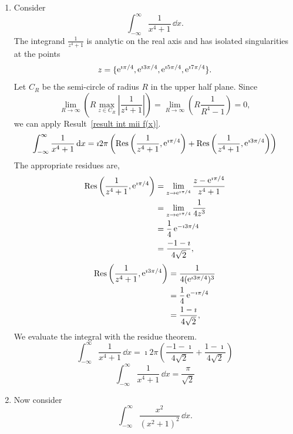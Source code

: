 {%
\begin{Solution}
  \label{solution 1/(x^4+1)}
  \begin{enumerate}
  \item
    Consider
    \[
    \int_{-\infty}^\infty \frac{1}{x^4 + 1} \,\dd x.
    \]
    The integrand $\frac{1}{z^4+1}$ is analytic on the real axis and has isolated
    singularities at the points 
    \[
    z = \{ \mathop{\mathrm{e}}\nolimits^{\imath \pi / 4}, \mathop{\mathrm{e}}\nolimits^{\imath 3 \pi / 4}, \mathop{\mathrm{e}}\nolimits^{\imath 5 \pi / 4}, \mathop{\mathrm{e}}\nolimits^{\imath 7 \pi / 4} \}.
    \]
    Let $C_R$ be the semi-circle of radius $R$ in the upper half plane.  Since 
    \[
    \lim_{R \to \infty} \left( R \max_{z \in C_R} \left| \frac{1}{z^4 + 1} \right|
    \right)
    = \lim_{R \to \infty} \left( R \frac{1}{R^4 - 1} \right) = 0,
    \]
    we can apply Result~\ref{result int mii f(x)}.
    \[
    \int_{-\infty}^\infty \frac{1}{x^4 + 1}\,\mathrm{d} x = \imath 2 \pi \left(
      \mathop{\mathrm{Res}}\nolimits\left( \frac{1}{z^4+1}, \mathop{\mathrm{e}}\nolimits^{\imath \pi / 4} \right) +
      \mathop{\mathrm{Res}}\nolimits\left( \frac{1}{z^4+1}, \mathop{\mathrm{e}}\nolimits^{\imath 3 \pi / 4} \right) \right)
    \]
    The appropriate residues are,
    \begin{align*}
      \mathop{\mathrm{Res}}\nolimits\left( \frac{1}{z^4+1}, \mathop{\mathrm{e}}\nolimits^{\imath \pi / 4} \right)
      &= \lim_{z \to \mathop{\mathrm{e}}\nolimits^{\imath \pi / 4}} \frac{z - \mathop{\mathrm{e}}\nolimits^{\imath \pi / 4}}{z^4+1} \\
      &= \lim_{z \to \mathop{\mathrm{e}}\nolimits^{\imath \pi / 4}} \frac{1}{4 z^3} \\
      &= \frac{1}{4} \mathop{\mathrm{e}}\nolimits^{- \imath 3 \pi / 4} \\
      &= \frac{-1 - \imath}{4 \sqrt{2}},
    \end{align*}
    \begin{align*}
      \mathop{\mathrm{Res}}\nolimits\left( \frac{1}{z^4+1}, \mathop{\mathrm{e}}\nolimits^{\imath 3 \pi / 4} \right)
      &= \frac{1}{4 (\mathop{\mathrm{e}}\nolimits^{\imath 3 \pi / 4})^3} \\
      &= \frac{1}{4} \mathop{\mathrm{e}}\nolimits^{- \imath \pi / 4} \\
      &= \frac{1 - \imath}{4 \sqrt{2}},
    \end{align*}
    We evaluate the integral with the residue theorem.
    \[
    \int_{-\infty}^\infty \frac{1}{x^4 + 1}\,\dd x = \imath 2 \pi \left( \frac{-1 - \imath}{4 \sqrt{2}}
      + \frac{1 - \imath}{4 \sqrt{2}} \right)
    \]
    \[
    \boxed{
      \int_{-\infty}^\infty \frac{1}{x^4 + 1}\,\dd x = \frac{\pi}{\sqrt{2}}
      }
    \]
  \item
    Now consider
    \[
    \int_{-\infty}^\infty \frac{x^2}{(x^2 + 1)^2} \,\dd x.
\]
\end{enumerate}
\end{Solution}}
